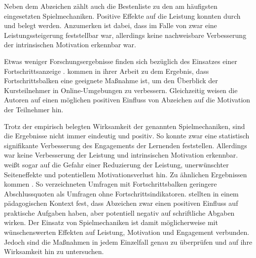 \documentclass[
    a4paper,
    doc,
    12pt,
    natbib,
]{apa6}
\begin{document}
Neben dem Abzeichen zählt auch die Bestenliste zu den am häufigsten eingesetzten Spielmechaniken. Positive Effekte auf die Leistung konnten durch \cite{brauer_badges_2019} und \cite{mekler_points_2013} belegt werden.
Anzumerken ist dabei, dass im Falle von \cite{mekler_points_2013} zwar eine Leistungssteigerung feststellbar war, allerdings keine nachweisbare Verbesserung der intrinsischen Motivation erkennbar war.

Etwas weniger Forschungsergebnisse finden sich bezüglich des Einsatzes einer Fortschrittsanzeige \citep{koivisto_rise_2019}.
\cite{olsson_visualisation_2016} kommen in ihrer Arbeit zu dem Ergebnis, dass Fortschrittsbalken eine geeignete Maßnahme ist, um den Überblick der Kursteilnehmer in Online-Umgebungen zu verbessern. Gleichzeitig weisen die Autoren auf einen möglichen positiven Einfluss von Abzeichen auf die Motivation der Teilnehmer hin.

Trotz der empirisch belegten Wirksamkeit der genannten Spielmechaniken, sind die Ergebnisse nicht immer eindeutig und positiv.
So konnte \cite{ortiz_gamification_2017} zwar eine statistisch signifikante Verbesserung des Engagements der Lernenden feststellen.
Allerdings war keine Verbesserung der Leistung und intrinsischen Motivation erkennbar.
\cite{toda_dark_2018} weißt sogar auf die Gefahr einer Reduzierung der Leistung, unerwünschter Seiteneffekte und potentiellem Motivationsverlust hin.
Zu ähnlichen Ergebnissen kommen \cite{liu_examining_2017}.
So verzeichneten Umfragen mit Fortschrittsbalken geringere Abschlussquoten als Umfragen ohne Fortschrittsindikatoren. \cite{dominguez_gamifying_2013} stellten in einem pädagogischen Kontext fest, dass Abzeichen zwar einen positiven Einfluss auf praktische Aufgaben haben, aber potentiell negativ auf schriftliche Abgaben wirken. Der Einsatz von Spielmechaniken ist damit möglicherweise mit wünschenswerten Effekten auf Leistung, Motivation und Engagement verbunden. Jedoch sind die Maßnahmen in jedem Einzelfall genau zu überprüfen und auf ihre Wirksamkeit hin zu untersuchen.
\end{document}
